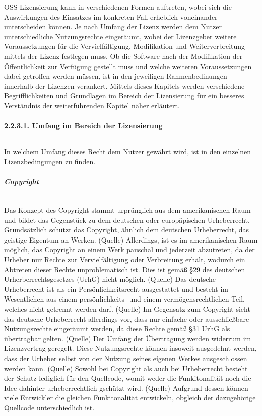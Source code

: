 OSS-Lizensierung kann in verschiedenen Formen auftreten, wobei sich die Auswirkungen des Einsatzes im konkreten Fall erheblich voneinander unterscheiden können. Je nach Umfang der Lizenz werden dem Nutzer unterschiedliche Nutzungsrechte eingeräumt, wobei der Lizenzgeber weitere Voraussetzungen für die Vervielfältigung, Modifikation und Weiterverbreitung mittels der Lizenz festlegen muss. Ob die Software nach der Modifikation der Öffentlichkeit zur Verfügung gestellt muss und welche weiteren Voraussetzungen dabei getroffen werden müssen, ist in den jeweiligen Rahmenbedinungen innerhalb der Lizenzen verankert. Mittels dieses Kapitels werden verschiedene Begrifflichkeiten und Grundlagen im Bereich der Lizensierung für ein besseres Verständnis der weiterführenden Kapitel näher erläutert. 

\paragraph{2.2.3.1. Umfang im Bereich der Lizensierung}$~$

In welchem Umfang dieses Recht dem Nutzer gewährt wird, ist in den einzelnen Lizenzbedingungen zu finden. 

\subparagraph{Copyright}$~$

Das Konzept des Copyright stammt urprünglich aus dem amerikanischen Raum und bildet das Gegenstück zu dem deutschen oder europäpischen Urheberrecht. Grundsätzlich schützt das Copyright, ähnlich dem deutschen Urheberrecht, das geistige Eigentum an Werken. (Quelle) Allerdings, ist es im amerikanischen Raum möglich, das Copyright an einem Werk pauschal und jederzeit abzutreten, da der Urheber nur Rechte zur Vervielfältigung oder Verbreitung erhält, wodurch ein Abtreten dieser Rechte unproblematisch ist. Dies ist gemäß §29 des deutschen Urherberrechtsgesetzes (UrhG) nicht möglich. (Quelle) Das deutsche Urheberrecht ist als ein Persönlichkeitsrecht ausgestattet und besteht im Wesentlichen aus einem persönlichkeits- und einem vermögensrechtlichen Teil, welches nicht getrennt werden darf. (Quelle) Im Gegensatz zum Copyright sieht das deutsche Urheberrecht allerdings vor, dass nur einfache oder ausschließbare Nutzungsrechte eingeräumt werden, da diese Rechte gemäß §31 UrhG als übertragbar gelten. (Quelle) Der Umfang der Übertragung werden widerrum im Lizenzvertrag geregelt. Diese Nutzungsrechte können insoweit ausgedehnt werden, dass der Urheber selbst von der Nutzung seines eigenen Werkes ausgeschlossen werden kann. (Quelle) Sowohl bei Copyright als auch bei Urheberrecht besteht der Schutz lediglich für den Quellcode, womit weder die Funkitonalität noch die Idee dahinter urheberrechtlich gschützt wird. (Quelle) Aufgrund dessen können viele Entwickler die gleichen Funkitonalität entwickeln, obgleich der dazugehörige Quellcode unterschiedlich ist.  

